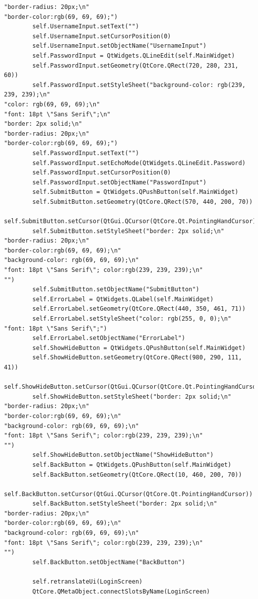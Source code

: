 \documentclass{article}
\begin{document}
\begin{lstlisting}
"border-radius: 20px;\n"
"border-color:rgb(69, 69, 69);")
        self.UsernameInput.setText("")
        self.UsernameInput.setCursorPosition(0)
        self.UsernameInput.setObjectName("UsernameInput")
        self.PasswordInput = QtWidgets.QLineEdit(self.MainWidget)
        self.PasswordInput.setGeometry(QtCore.QRect(720, 280, 231, 60))
        self.PasswordInput.setStyleSheet("background-color: rgb(239, 239, 239);\n"
"color: rgb(69, 69, 69);\n"
"font: 18pt \"Sans Serif\";\n"
"border: 2px solid;\n"
"border-radius: 20px;\n"
"border-color:rgb(69, 69, 69);")
        self.PasswordInput.setText("")
        self.PasswordInput.setEchoMode(QtWidgets.QLineEdit.Password)
        self.PasswordInput.setCursorPosition(0)
        self.PasswordInput.setObjectName("PasswordInput")
        self.SubmitButton = QtWidgets.QPushButton(self.MainWidget)
        self.SubmitButton.setGeometry(QtCore.QRect(570, 440, 200, 70))
        self.SubmitButton.setCursor(QtGui.QCursor(QtCore.Qt.PointingHandCursor))
        self.SubmitButton.setStyleSheet("border: 2px solid;\n"
"border-radius: 20px;\n"
"border-color:rgb(69, 69, 69);\n"
"background-color: rgb(69, 69, 69);\n"
"font: 18pt \"Sans Serif\"; color:rgb(239, 239, 239);\n"
"")
        self.SubmitButton.setObjectName("SubmitButton")
        self.ErrorLabel = QtWidgets.QLabel(self.MainWidget)
        self.ErrorLabel.setGeometry(QtCore.QRect(440, 350, 461, 71))
        self.ErrorLabel.setStyleSheet("color: rgb(255, 0, 0);\n"
"font: 18pt \"Sans Serif\";")
        self.ErrorLabel.setObjectName("ErrorLabel")
        self.ShowHideButton = QtWidgets.QPushButton(self.MainWidget)
        self.ShowHideButton.setGeometry(QtCore.QRect(980, 290, 111, 41))
        self.ShowHideButton.setCursor(QtGui.QCursor(QtCore.Qt.PointingHandCursor))
        self.ShowHideButton.setStyleSheet("border: 2px solid;\n"
"border-radius: 20px;\n"
"border-color:rgb(69, 69, 69);\n"
"background-color: rgb(69, 69, 69);\n"
"font: 18pt \"Sans Serif\"; color:rgb(239, 239, 239);\n"
"")
        self.ShowHideButton.setObjectName("ShowHideButton")
        self.BackButton = QtWidgets.QPushButton(self.MainWidget)
        self.BackButton.setGeometry(QtCore.QRect(10, 460, 200, 70))
        self.BackButton.setCursor(QtGui.QCursor(QtCore.Qt.PointingHandCursor))
        self.BackButton.setStyleSheet("border: 2px solid;\n"
"border-radius: 20px;\n"
"border-color:rgb(69, 69, 69);\n"
"background-color: rgb(69, 69, 69);\n"
"font: 18pt \"Sans Serif\"; color:rgb(239, 239, 239);\n"
"")
        self.BackButton.setObjectName("BackButton")

        self.retranslateUi(LoginScreen)
        QtCore.QMetaObject.connectSlotsByName(LoginScreen)


\end{lstlisting}
\end{document}
